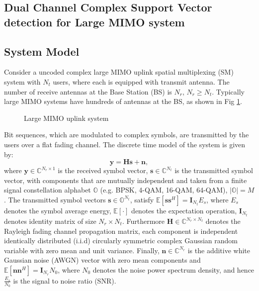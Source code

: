 \documentclass[12pt, draftclsnofoot, onecolumn]{IEEEtran}
\begin{document}
\begin{spacing}{2}
 
\section{Dual Channel Complex Support Vector detection for Large MIMO system}\label{dual channel CSVR}
\subsection{System Model}\label{system model}
  Consider a uncoded complex large MIMO uplink spatial multiplexing (SM) system with $N_{t}$ users, where each is equipped with transmit antenna. The number of receive antennas at the Base Station (BS) is $N_{r}$, $N_{r}\geq N_{t}$. Typically large MIMO systems have hundreds of antennas at the BS, as shown in Fig {\ref{large MIMO uplink model}}.
  \begin{figure}[htb]
  \centering
  \def\svgwidth{\columnwidth}
  
  \caption{Large MIMO uplink system }
  \label{large MIMO uplink model}
  \end{figure}
    
Bit sequences, which are modulated to complex symbols, are transmitted by the users over a flat fading channel. The discrete time model of the system is given by:
\begin{equation}
\mathbf{y}=\mathbf{H}\mathbf{s}+\mathbf{n},   \label{discrete time MIMO system}
\end{equation}
where $\mathbf{y}\in\mathbb{C}^{N_{r}\times 1}$ is the received symbol vector, $\mathbf{s}\in \mathbb{C}^{N_{t}}$ is the transmitted symbol vector, with components that are mutually independent and taken from a finite signal constellation alphabet $\mathbb{O}$ (e.g. BPSK, 4-QAM, 16-QAM, 64-QAM), $|\mathbb{O}|=M$. The transmitted symbol vectors $\mathbf{s}\in \mathbb{O}^{N_{t}}$, satisfy $\mathbb{E}[\mathbf{s}\mathbf{s}^{H}]=\mathbf{I}_{N_t}E_{s}$, where $E_{s}$ denotes the symbol average energy, $\mathbb{E}[\cdot]$ denotes the expectation operation, $\mathbf{I}_{N_{t}}$ denotes identity matrix of size $N_{r}\times N_{t}$. Furthermore $\mathbf{H}\in \mathbb{C}^{N_{r}\times N_{t}}$ denotes the Rayleigh fading channel propagation matrix, each component is independent identically distributed (i.i.d) circularly symmetric complex Gaussian random variable with zero mean and unit variance. Finally, $\mathbf{n}\in \mathbb{C}^{N_{r}}$ is the additive white Gaussian noise (AWGN) vector with zero mean components and $\mathbb{E}[\mathbf{n}\mathbf{n}^{H}]=\mathbf{I}_{N_{r}}N_{0}$, where $N_{0}$ denotes the noise power spectrum density, and hence $\frac{E_{s}}{N_{0}}$ is the signal to noise ratio (SNR). 


\end{spacing}
\end{document}

